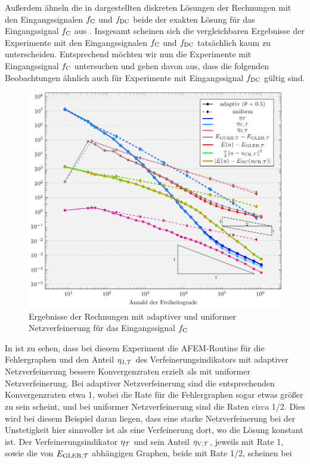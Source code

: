 Außerdem ähneln die in  dargestellten diskreten Lösungen der
Rechnungen mit den Eingangssignalen $f_\textup{C}$ und $f_\textup{DC}$ beide der exakten Lösung
für das Eingangssignal $f_\textup{C}$ aus .
Insgesamt scheinen sich die vergleichbaren Ergebnisse der Experimente mit den
Eingangssignalen $f_\textup{C}$ und $f_\textup{DC}$ tatsächlich kaum zu unterscheiden.
Entsprechend möchten wir nun die Experimente mit Eingangssignal $f_\textup{C}$
untersuchen und gehen davon aus, dass die folgenden Beobachtungen ähnlich auch 
für Experimente mit Eingangssignal $f_\textup{DC}$ gültig sind.
\begin{figure}[p]
  \centering
  \includegraphics[width=.8\linewidth]
    {pictures/chapExperiments/secGrayscale/circ/convCont.pdf}
  \caption{Ergebnisse der Rechnungen mit adaptiver und uniformer 
    Netzverfeinerung für das Eingangssignal $f_\textup{C}$}
  \label{fig:circContConvergence}
\end{figure}
In  ist zu sehen, dass bei diesem Experiment die
AFEM-Routine für die Fehlergraphen und den Anteil $\eta_{\textup{J}, \mathcal{T}}$ des
Verfeinerungsindikators mit adaptiver Netzverfeinerung bessere Konvergenzraten
erzielt als mit uniformer Netzverfeinerung.
Bei adaptiver Netzverfeinerung sind die entsprechenden Konvergenzraten etwa 1,
wobei die Rate für die Fehlergraphen sogar etwas größer zu sein scheint, und
bei uniformer Netzverfeinerung sind die Raten circa 1/2.
Dies wird bei diesem Beispiel daran liegen, dass eine starke Netzverfeinerung
bei der Unstetigkeit hier sinnvoller ist als eine Verfeinerung dort,
wo die Lösung konstant ist.
Der Verfeinerungsindikator $\eta_{\mathcal{T}}$ und sein Anteil $\eta_{\textup{V}, \mathcal{T}}$, jeweils mit Rate 1,
sowie die von $E_{\textup{GLEB}, \mathcal{T}}$ abhängigen Graphen, beide mit Rate 1/2, scheinen bei
